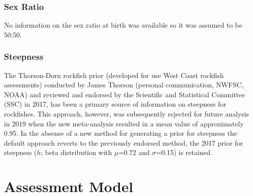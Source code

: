 \documentclass[11pt,
  english,
  a4paper,
]{article}
\begin{document}
\leavevmode\tagmcend\tagstructend\par


\hypertarget{sex-ratio}{%
\subsubsection{Sex Ratio}\label{sex-ratio}}

\leavevmode\tagmcend\tagstructend


No information on the sex ratio at birth was available so it was assumed to be 50:50.

\leavevmode\tagmcend\tagstructend\par


\hypertarget{steepness}{%
\subsubsection{Steepness}\label{steepness}}

\leavevmode\tagmcend\tagstructend


The Thorson-Dorn rockfish prior (developed for use West Coast rockfish assessments) conducted by James Thorson (personal communication, NWFSC, NOAA) and reviewed and endorsed by the Scientific and Statistical Committee (SSC) in 2017, has been a primary source of information on steepness for rockfishes. This approach, however, was subsequently rejected for future analysis in 2019 when the new meta-analysis resulted in a mean value of approximately 0.95. In the absense of a new method for generating a prior for steepness the default approach reverts to the previously endorsed method, the 2017 prior for steepness ({\(h\)\leavevmode\tagmcend\tagstructend}; beta distribution with {\(\mu\)\leavevmode\tagmcend\tagstructend}=0.72 and {\(\sigma\)\leavevmode\tagmcend\tagstructend}=0.15) is retained.

\leavevmode\tagmcend\tagstructend\par


\hypertarget{assessment-model}{%
\section{Assessment Model}\label{assessment-model}}
\end{document}
